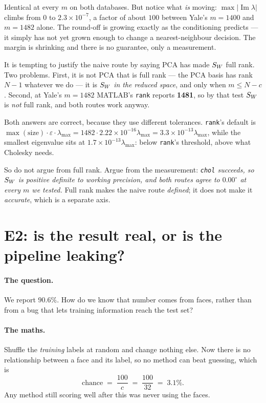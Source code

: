 Identical at every $m$ on both databases. But notice what \emph{is} moving:
$\max|\operatorname{Im}\lambda|$ climbs from $0$ to $2.3\times10^{-7}$, a factor
of about $100$ between Yale's $m=1400$ and $m=1482$ alone. The round-off is
growing exactly as the conditioning predicts --- it simply has not yet grown
enough to change a nearest-neighbour decision. The margin is shrinking and
there is no guarantee, only a measurement.

\begin{gotcha}
\label{sec:rankcholgotcha}
It is tempting to justify the naive route by saying PCA has made $S_W$ full
rank. Two problems. First, it is not PCA that is full rank --- the PCA basis has
rank $N-1$ whatever we do --- it is $S_W$ \emph{in the reduced space}, and only
when $m \le N-c$. Second, at Yale's $m = 1482$ MATLAB's \texttt{rank} reports
\textbf{1481}, so by that test $S_W$ is \emph{not} full rank, and both routes
work anyway.

Both answers are correct, because they use different tolerances.
\texttt{rank}'s default is
$\max(\text{size})\cdot\varepsilon\cdot\lambda_{\max}
= 1482 \cdot 2.22\times10^{-16}\lambda_{\max} = 3.3\times10^{-13}\lambda_{\max}$,
while the smallest eigenvalue sits at $1.7\times10^{-13}\lambda_{\max}$: below
\texttt{rank}'s threshold, above what Cholesky needs.

So do not argue from full rank. Argue from the measurement: \emph{\texttt{chol}
succeeds, so $S_W$ is positive definite to working precision, and both routes
agree to $0.00^\circ$ at every $m$ we tested.} Full rank makes the naive route
\emph{defined}; it does not make it \emph{accurate}, which is a separate axis.
\end{gotcha}

\section{E2: is the result real, or is the pipeline leaking?}

\paragraph{The question.} We report $90.6\%$. How do we know that number comes
from faces, rather than from a bug that lets training information reach the
test set?

\paragraph{The maths.} Shuffle the \emph{training} labels at random and change
nothing else. Now there is no relationship between a face and its label, so no
method can beat guessing, which is
\[
  \text{chance} \;=\; \frac{100}{c} \;=\; \frac{100}{32} \;=\; 3.1\% .
\]
Any method still scoring well after this was never using the faces.

